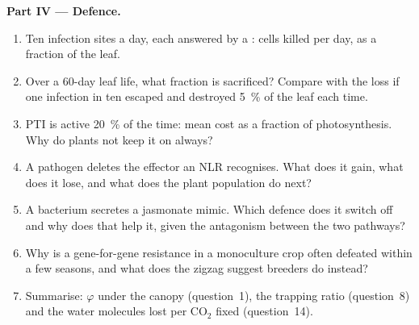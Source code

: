 \begin{problem}
\medskip
\noindent\textbf{Part IV --- Defence.}
\begin{enumerate}[resume]
  \item Ten infection sites a day, each answered by a : cells killed per day, as a fraction of the leaf.
  \item Over a 60-day leaf life, what fraction is sacrificed? Compare
        with the loss if one infection in ten escaped and destroyed
        \qty{5}{\%} of the leaf each time.
  \item PTI is active \qty{20}{\%} of the time: mean cost as a fraction
        of photosynthesis. Why do plants not keep it on always?
  \item A pathogen deletes the effector an NLR recognises. What does it
        gain, what does it lose, and what does the plant population do
        next?
  \item A bacterium secretes a jasmonate mimic. Which defence does it
        switch off and why does that help it, given the antagonism
        between the two  pathways?
  \item Why is a gene-for-gene resistance in a monoculture crop often
        defeated within a few seasons, and what does the zigzag suggest
        breeders do instead?
  \item Summarise: $\varphi$ under the canopy (question~1), the 
        trapping ratio (question~8) and the water molecules lost per
        CO$_{2}$ fixed (question~14).
\end{enumerate}
\end{problem}
